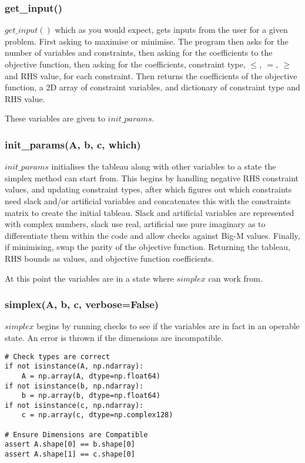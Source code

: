 \documentclass[letterpaper, a4paper]{article}
\begin{document}
\subsubsection{get\_input()}
$get\_input()$ which as you would expect, gets inputs from the user for a given problem. First asking to maximise or minimise. The program then asks for the number of variables and constraints, then asking for the coefficients to the objective function, then asking for the coefficients, constraint type, $\le,\ =,\ \ge$ and RHS value, for each constraint. Then returns the coefficients of the objective function, a 2D array of constraint variables, and dictionary of constraint type and RHS value.
\newline

These variables are given to $init\_params$.

\subsubsection{init\_params(A, b, c, which)}

$init\_params$ initialises the tableau along with other variables to a state the simplex method can start from. This begins by handling negative RHS constraint values, and updating constraint types, after which figures out which constraints need slack and/or artificial variables and concatenates this with the constraints matrix to create the initial tableau. Slack and artificial variables are represented with complex numbers, slack use real, artificial use pure imaginary as to differentiate them within the code and allow checks against Big-M values. Finally, if minimising, swap the parity of the objective function.
Returning the tableau, RHS bounds as values, and objective function coefficients.
\newline

At this point the variables are in a state where $simplex$ can work from.

\subsubsection{simplex(A, b, c, verbose=False)}
$simplex$ begins by running checks to see if the variables are in fact in an operable state. An error is thrown if the dimensions are incompatible.

\begingroup
\fontsize{8}{10}\selectfont
\begin{verbatim}
# Check types are correct
if not isinstance(A, np.ndarray):
    A = np.array(A, dtype=np.float64)
if not isinstance(b, np.ndarray):
    b = np.array(b, dtype=np.float64)
if not isinstance(c, np.ndarray):
    c = np.array(c, dtype=np.complex128)

# Ensure Dimensions are Compatible
assert A.shape[0] == b.shape[0]
assert A.shape[1] == c.shape[0]

\end{verbatim}
\endgroup
\end{document}
